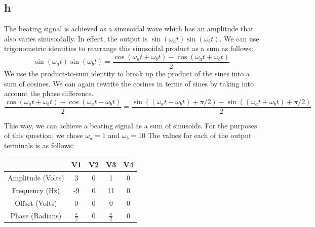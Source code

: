 \documentclass{article}
\theoremstyle{plain}
\theoremstyle{definition}
\theoremstyle{remark}
\begin{document}


\subsection*{h} 
The beating signal is achieved as a sinusoidal wave which has an amplitude that also varies sinusoidally. In effect, the output is $\sin(\omega_a t)\sin(\omega_b t) $. We can use trigonometric identities to rearrange this sinusoidal product as a sum as follows:
$$\sin(\omega_a t)\sin(\omega_b t) = \frac{\cos(\omega_a t + \omega_b t) - \cos(\omega_a t + \omega_b t)}{2}$$
We use the product-to-sum identity to break up the product of the sines into a sum of cosines. We can again rewrite the cosines in terms of sines by taking into account the phase difference.
$$\frac{\cos(\omega_a t + \omega_b t) - \cos(\omega_a t + \omega_b t)}{2} = \frac{\sin((\omega_a t + \omega_b t) + \pi/2)- \sin((\omega_a t + \omega_b t) + \pi/2)}{2}$$

This way, we can achieve a beating signal as a sum of sinusoids. For the purposes of this question, we chose $\omega_a = 1$ and $\omega_b = 10$ The values for each of the output terminals is as follows:
\begin{table}[h]
\begin{center}
    \begin{tabular}{|c||c|c|c|c|}
        \hline
        ~                 & V1              & V2 & V3              & V4 \\ \hline \hline
        Amplitude (Volts) & 3               & 0  & 1               & 0  \\ \hline
        Frequency (Hz)    & -9              & 0  & 11              & 0  \\ \hline
        Offset (Volts)    & 0               & 0  & 0               & 0  \\ \hline
        Phase (Radians)            & $\frac{\pi}{2}$ & 0  & $\frac{\pi}{2}$ & 0  \\
        \hline
    \end{tabular}
\end{center}
\end{table}
\end{document}
